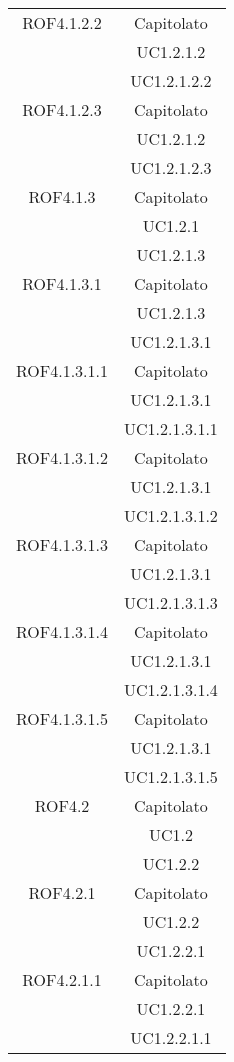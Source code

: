 \begin{longtable}{|c|c|}
\midrule
ROF4.1.2.2
& Capitolato\\
& UC1.2.1.2\\
& UC1.2.1.2.2\\

\midrule
ROF4.1.2.3
& Capitolato\\
& UC1.2.1.2\\
& UC1.2.1.2.3\\

\midrule
ROF4.1.3
& Capitolato\\
& UC1.2.1\\
& UC1.2.1.3\\

\midrule
ROF4.1.3.1
& Capitolato\\
& UC1.2.1.3\\
& UC1.2.1.3.1\\

\midrule
ROF4.1.3.1.1
& Capitolato\\
& UC1.2.1.3.1\\
& UC1.2.1.3.1.1\\

\midrule
ROF4.1.3.1.2
& Capitolato\\
& UC1.2.1.3.1\\
& UC1.2.1.3.1.2\\

\midrule
ROF4.1.3.1.3
& Capitolato\\
& UC1.2.1.3.1\\
& UC1.2.1.3.1.3\\

\midrule
ROF4.1.3.1.4
& Capitolato\\
& UC1.2.1.3.1\\
& UC1.2.1.3.1.4\\

\midrule
ROF4.1.3.1.5
& Capitolato\\
& UC1.2.1.3.1\\
& UC1.2.1.3.1.5\\

\midrule
ROF4.2
& Capitolato\\
& UC1.2\\
& UC1.2.2\\

\midrule
ROF4.2.1
& Capitolato\\
& UC1.2.2\\
& UC1.2.2.1\\

\midrule
ROF4.2.1.1
& Capitolato\\
& UC1.2.2.1\\
& UC1.2.2.1.1\\


\end{longtable}
